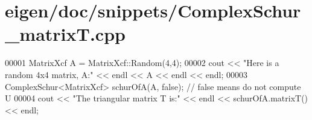 \hypertarget{eigen_2doc_2snippets_2_complex_schur__matrix_t_8cpp_source}{}\section{eigen/doc/snippets/\+Complex\+Schur\+\_\+matrixT.cpp}
\label{eigen_2doc_2snippets_2_complex_schur__matrix_t_8cpp_source}

\begin{DoxyCode}
00001 MatrixXcf A = MatrixXcf::Random(4,4);
00002 cout << \textcolor{stringliteral}{"Here is a random 4x4 matrix, A:"} << endl << A << endl << endl;
00003 ComplexSchur<MatrixXcf> schurOfA(A, \textcolor{keyword}{false}); \textcolor{comment}{// false means do not compute U}
00004 cout << \textcolor{stringliteral}{"The triangular matrix T is:"} << endl << schurOfA.matrixT() << endl;
\end{DoxyCode}
